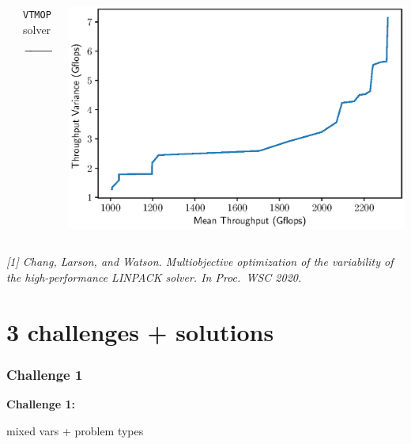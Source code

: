 \documentclass[aspectratio=169]{beamer}
\begin{document}
\begin{frame}
\begin{columns}
\begin{column}{.3\textwidth}
\begin{center}
\end{center}
\end{column}
\begin{column}{.2\textwidth}
\begin{center}
{\tt VTMOP} solver
$$\xrightarrow{\hspace*{2cm}}$$
\end{center}
\end{column}
\begin{column}{.4\textwidth}
\includegraphics[width=\textwidth]{../img/moo_old/hpl_n20k_pf.eps}
\end{column}
\end{columns}

\vfill

{\tiny\it
[1] Chang, Larson, and Watson.
Multiobjective optimization of the variability of the high-performance 
LINPACK solver.
{\sl In Proc.\ WSC 2020.}\\
}
\end{frame}

\section{3 challenges + solutions}

\begin{frame}\frametitle{Challenge 1}
\vfill
\begin{center}
{\Huge \bf
Challenge 1:\\

\bigskip

mixed vars + problem types
}
\end{center}
\vfill
\end{frame}
\end{document}
